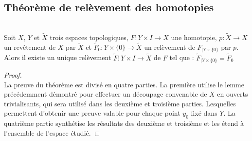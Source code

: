 	\subsection{Théorème de relèvement des homotopies}
		\begin{theo}~\\
			Soit $X$, $Y$ et $\tilde{X}$ trois espaces topologiques, $F : Y\times I \longrightarrow X$ une homotopie, 
			$p:\tilde{X}\longrightarrow X$ un revêtement de $X$ par $\tilde{X}$ et 
			$\tilde{F}_{0} : Y\times \{0\} \longrightarrow \tilde{X}$ un relèvement de $F_{|Y\times \{0\}}$ par $p$.\\
			Alors il existe un unique relèvement $\tilde{F} : Y\times I \longrightarrow \tilde{X}$ de $F$ tel que : 
			$\tilde{F}_{|Y\times \{0\}} = \tilde{F}_{0}$
		\end{theo}
		\begin{proof}~\\
			La preuve du théorème est divisé en quatre parties. La première utilise le lemme précédemment démontré pour effectuer 
			un découpage convenable de $X$ en ouverts trivialisants, qui sera utilisé dans les deuxième et troisième parties. 
			Lesquelles permettent d'obtenir une preuve valable pour chaque point ${y_{0}}$ fixé dans $Y$. 
			La quatrième partie synthétise les résultats des deuxième et troisième et les étend à l'ensemble de l'espace étudié.
			

\end{proof}

